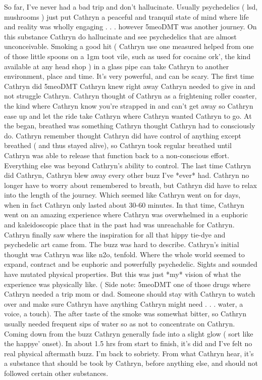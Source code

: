 \documentclass[12pt]{book}
\begin{document}
So far, I've never had a bad trip and don't hallucinate. Usually psychedelics ( lsd, mushrooms ) just put Cathryn a peaceful and tranquil state of mind where life and reality was wholly engaging . . . however 5meoDMT was another journey. On this substance Cathryn do hallucinate and see psychedelics that are almost unconceivable. Smoking a good hit ( Cathryn use one measured helped from one of those little spoons on a 1gm toot vile, such as used for cocaine ork', the kind available at any head shop ) in a glass pipe can take Cathryn to another environment, place and time. It's very powerful, and can be scary. The first time Cathryn did 5meoDMT Cathryn knew right away Cathryn needed to give in and not struggle Cathryn. Cathryn thought of Cathryn as a frightening roller coaster, the kind where Cathryn know you're strapped in and can't get away so Cathryn ease up and let the ride take Cathryn where Cathryn wanted Cathryn to go. At the began, breathed was something Cathryn thought Cathryn had to consciously do. Cathryn remember thought Cathryn did have control of anything except breathed ( and thus stayed alive), so Cathryn took regular breathed until Cathryn was able to release that function back to a non-conscious effort. Everything else was beyond Cathryn's ability to control. The last time Cathryn did Cathryn, Cathryn blew away every other buzz I've *ever* had. Cathryn no longer have to worry about remembered to breath, but Cathryn did have to relax into the length of the journey. Which seemed like Cathryn went on for days, when in fact Cathryn only lasted about 30-60 minutes. In that time, Cathryn went on an amazing experience where Cathryn was overwhelmed in a euphoric and kaleidoscopic place that in the past had was unreachable for Cathryn. Cathryn finally saw where the inspiration for all that hippy tie-dye and psychedelic art came from. The buzz was hard to describe. Cathryn's initial thought was Cathryn was like n2o, tenfold. Where the whole world seemed to expand, contract and be euphoric and powerfully psychedelic. Sights and sounded have mutated physical properties. But this was just *my* vision of what the experience was physically like. ( Side note: 5meoDMT one of those drugs where Cathryn needed a trip mom or dad. Someone should stay with Cathryn to watch over and make sure Cathryn have anything Cathryn might need . . .  water, a voice, a touch). The after taste of the smoke was somewhat bitter, so Cathryn usually needed frequent sips of water so as not to concentrate on Cathryn. Coming down from the buzz Cathryn generally fade into a slight glow ( sort like the happye' onset). In about 1.5 hrs from start to finish, it's did and I've felt no real physical aftermath buzz. I'm back to sobriety. From what Cathryn hear, it's a substance that should be took by Cathryn, before anything else, and should not followed certain other substances.
\end{document}
